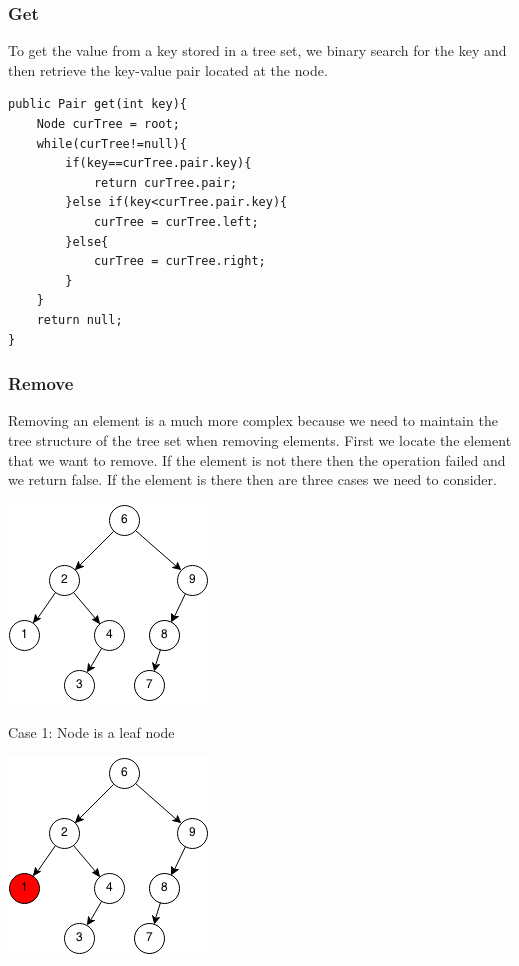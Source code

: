 \documentclass[11pt,oneside]{book}
\makeatletter
\def\maxwidth#1{\ifdim\Gin@nat@width>#1 #1\else\Gin@nat@width\fi}
\makeatother
\begin{document}
\subsubsection{Get}

To get the value from a key stored in a tree set, we binary search for the key and then retrieve the key-value pair located at the node.

\begin{lstlisting}
public Pair get(int key){
    Node curTree = root;
    while(curTree!=null){
        if(key==curTree.pair.key){
            return curTree.pair;
        }else if(key<curTree.pair.key){
            curTree = curTree.left;
        }else{
            curTree = curTree.right;
        }
    }
    return null;
}
\end{lstlisting}

\subsubsection{Remove}

Removing an element is a much more complex because we need to maintain the tree structure of the tree set when removing elements. First we locate the element that we want to remove. If the element is not there then the operation failed and we return false. If the element is there then are three cases we need to consider.

\vspace{5px}\includegraphics[width=\maxwidth{\textwidth}]{bst-rem.png}

Case 1: Node is a leaf node

\vspace{5px}\includegraphics[width=\maxwidth{\textwidth}]{bst-rem-case11.png}
\end{document}
